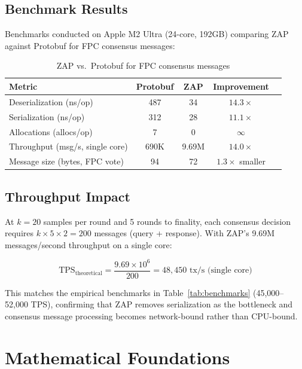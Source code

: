 \documentclass[11pt,a4paper]{article}
\begin{document}
\subsection{Benchmark Results}

Benchmarks conducted on Apple M2 Ultra (24-core, 192GB) comparing ZAP against Protobuf for FPC consensus messages:

\begin{table}[h]
\centering
\begin{tabular}{lcccc}
\toprule
\textbf{Metric} & \textbf{Protobuf} & \textbf{ZAP} & \textbf{Improvement} \\
\midrule
Deserialization (ns/op) & 487 & 34 & $14.3\times$ \\
Serialization (ns/op) & 312 & 28 & $11.1\times$ \\
Allocations (allocs/op) & 7 & 0 & $\infty$ \\
Throughput (msg/s, single core) & 690K & 9.69M & $14.0\times$ \\
Message size (bytes, FPC vote) & 94 & 72 & $1.3\times$ smaller \\
\bottomrule
\end{tabular}
\caption{ZAP vs.\ Protobuf for FPC consensus messages}
\label{tab:zap}
\end{table}

\subsection{Throughput Impact}

At $k = 20$ samples per round and 5 rounds to finality, each consensus decision requires $k \times 5 \times 2 = 200$ messages (query + response). With ZAP's 9.69M messages/second throughput on a single core:

\begin{equation}
\text{TPS}_{\text{theoretical}} = \frac{9.69 \times 10^6}{200} = 48{,}450 \text{ tx/s (single core)}
\end{equation}

This matches the empirical benchmarks in Table~\ref{tab:benchmarks} (45,000--52,000 TPS), confirming that ZAP removes serialization as the bottleneck and consensus message processing becomes network-bound rather than CPU-bound.

\section{Mathematical Foundations}
\label{sec:math}
\end{document}
